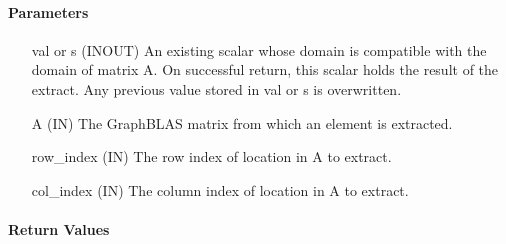 \paragraph{Parameters}

\begin{itemize}[leftmargin=1in]
    \item[{\sf val} or {\sf s}]   ({\sf INOUT}) An existing scalar whose domain is 
    compatible with the domain of matrix {\sf A}. On successful return, this scalar 
    holds the result of the extract.  Any previous value stored in {\sf val} or {\sf s} is 
    overwritten.

    \item[{\sf A}]     ({\sf IN}) The GraphBLAS matrix from which an element is
    extracted.
    
    \item[{\sf row\_index}] ({\sf IN}) The row index of location in {\sf A} 
    to extract.

    \item[{\sf col\_index}] ({\sf IN}) The column index of location in {\sf A} 
    to extract.
\end{itemize}

\paragraph{Return Values}

